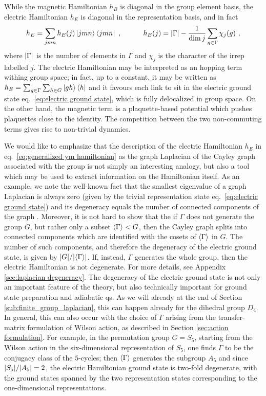 While the magnetic Hamiltonian $h_B$ is diagonal in the group element basis, the electric Hamiltonian $h_E$ is diagonal in the representation basis, and in fact
\begin{equation}
    \label{eq:electric hamiltonian rep basis}
    h_E = \sum_{jmn} h_E(j) \ket{jmn}\bra{jmn} \ , \quad \quad \quad h_E(j)=\abs{\Gamma} - \frac{1}{\dim{j}} \sum_{g \in \Gamma} \chi_j(g)\ ,
\end{equation}
where $\abs{\Gamma}$ is the number of elements in $\Gamma$ and $\chi_j$ is the character of the irrep labelled $j$.
The electric Hamiltonian may be interpreted as an  hopping term withing group space; in fact, up to a constant, it may be written as $h_E = \sum_{g \in \Gamma} \sum_{h \in G} \ket{gh}\bra{h}$ and it favours each link to sit in the electric ground state eq.~\eqref{eq:electric ground state}, which is fully delocalized in group space.
On the other hand, the magnetic term is a plaquette-based potential which pushes plaquettes close to the identity.
The competition between the two non-commuting terms gives rise to non-trivial dynamics.

We would like to emphasize that the description of the electric Hamiltonian $h_E$ in eq.~\eqref{eq:generalized ym hamiltonian} as the graph Laplacian of the Cayley graph associated with the group is not simply an interesting analogy, but also a tool which may be used to extract information on the Hamiltonian itself.
As an example, we note the well-known fact that the smallest eigenvalue of a graph Laplacian is always zero (given by the trivial representation state eq.~\eqref{eq:electric ground state}) and its degeneracy equals the number of connected components of the graph \cite{spectralgraphtheory}.
Moreover, it is not hard to show that the if $\Gamma$ does not generate the group $G$, but rather only a subset $\expval{\Gamma} < G$, then the Cayley graph splits into connected components which are identified with the cosets of $\expval{\Gamma}$ in $G$.
The number of such components, and therefore the degeneracy of the electric ground state, is given by $\abs{G}/\abs{\expval{\Gamma}}$.
If, instead, $\Gamma$ generates the whole group, then the electric Hamiltonian is not degenerate.
For more details, see Appendix \ref{sec:laplacian degeneracy}.
The degeneracy of the electric ground state is not only an important feature of the theory, but also technically important for ground state preparation and adiabatic \ac{qs}.
As we will already at the end of Section \ref{sub:finite_group_laplacian}, this can happen already for the dihedral group $D_4$.
In general, this can also occur with the choice of $\Gamma$ arising from the transfer-matrix formulation of Wilson action, as described in Section \ref{sec:action formulation}.
For example, in the permutation group $G=S_5$, starting from the Wilson action in the six-dimensional representation of $S_5$, one finds $\Gamma$ to be the conjugacy class of the $5$-cycles; then $\expval{\Gamma}$ generates the subgroup $A_5$ and since $\abs{S_5}/\abs{A_5}=2$, the electric Hamiltonian ground state is two-fold degenerate, with the ground states spanned by the two representation states corresponding to the one-dimensional representations.


